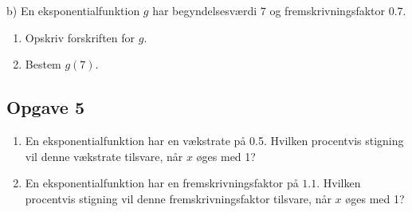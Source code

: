 b) En eksponentialfunktion $g$ har begyndelsesværdi $7$ og fremskrivningsfaktor $0.7$.
\begin{enumerate}[label=\roman*)]
	\item Opskriv forskriften for $g$. 
	\item Bestem $g(7)$. 
\end{enumerate}


\subsection*{Opgave 5}

\begin{enumerate}[label= \roman*)]
	\item En eksponentialfunktion har en vækstrate på 0.5. Hvilken procentvis stigning vil 
	denne vækstrate tilsvare, når $x$ øges med 1?
	\item En eksponentialfunktion har en fremskrivningsfaktor på $1.1$. Hvilken procentvis 
	stigning vil denne fremskrivningsfaktor tilsvare, når $x$ øges med 1?
\end{enumerate}


\newpage

